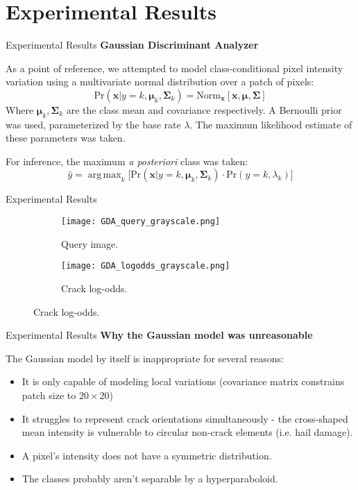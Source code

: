 \documentclass[10pt]{beamer}
\DeclareMathOperator*{\argmax}{arg\,max}
\begin{document}
\section{Experimental Results}

\begin{frame}{Experimental Results}
	\textbf{Gaussian Discriminant Analyzer}
	
	As a point of reference, we attempted to model class-conditional pixel intensity variation using a multivariate normal distribution over a patch of pixels:
	\[
		\text{Pr}(\mathbf{x}|y = k, \boldsymbol{\mu}_k, \mathbf{\Sigma}_k) = \text{Norm}_{\mathbf{x}}[\mathbf{x}, \boldsymbol{\mu}, \mathbf{\Sigma}]
	\]
	Where $\boldsymbol{\mu}_k, \mathbf{\Sigma}_k$ are the class mean and covariance respectively. A Bernoulli prior was used, parameterized by the base rate $\lambda$. The maximum likelihood estimate of these parameters was taken.
	
	 For inference, the maximum \emph{a posteriori} class was taken:
	\[
		\hat{y} = \argmax_k \Big[\text{Pr}(\mathbf{x}|y = k, \boldsymbol{\mu}_k, \mathbf{\Sigma}_k) \cdot \text{Pr}(y = k, \lambda_k) \Big]
	\]
\end{frame}

\begin{frame}{Experimental Results}
	\begin{figure}
		\begin{subfigure}[b]{0.25\textwidth}
			\texttt{[image: GDA\_query\_grayscale.png]}
			\caption{Query image.}
		\end{subfigure}
		\qquad\qquad
		\begin{subfigure}[b]{0.25\textwidth}
			\texttt{[image: GDA\_logodds\_grayscale.png]}
			\caption{Crack log-odds.}
		\end{subfigure}
	
	\end{figure}
\end{frame}

\begin{frame}{Experimental Results}
	\textbf{Why the Gaussian model was unreasonable}
	
	The Gaussian model by itself is inappropriate for several reasons:
	\begin{itemize}
		\item It is only capable of modeling local variations (covariance matrix constrains patch size to $20 \times 20$)
		\item It struggles to represent crack orientations simultaneously - the cross-shaped mean intensity is vulnerable to circular non-crack elements (i.e. hail damage).
		\item A pixel's intensity does not have a symmetric distribution.
		\item The classes probably aren't separable by a hyperparaboloid.
	\end{itemize}
\end{frame}
\end{document}
